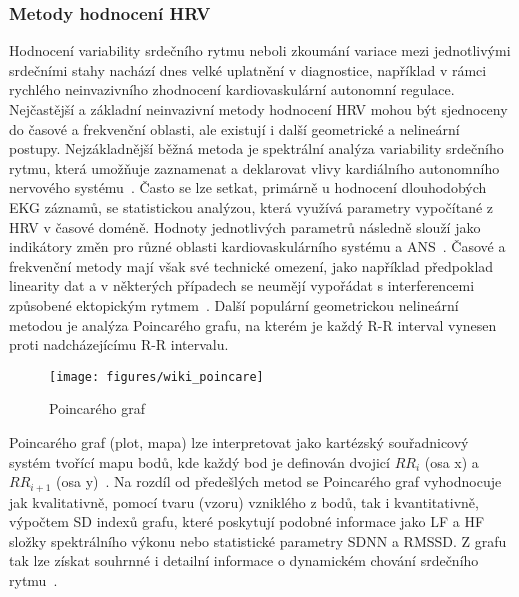 \subsubsection{Metody hodnocení HRV}
\label{section:hrv_methods}
Hodnocení variability srdečního rytmu neboli zkoumání variace mezi jednotlivými
srdečními stahy nachází dnes velké uplatnění v diagnostice, například v rámci
rychlého neinvazivního zhodnocení kardiovaskulární autonomní regulace.
Nejčastější a základní neinvazivní metody hodnocení HRV mohou být sjednoceny do
časové a frekvenční oblasti, ale existují i další geometrické a nelineární
postupy. Nejzákladnější běžná metoda je spektrální analýza variability srdečního
rytmu, která umožňuje zaznamenat a deklarovat vlivy kardiálního autonomního
nervového systému~\cite{Pumprla2014}. Často se lze setkat, primárně u hodnocení
dlouhodobých EKG záznamů, se statistickou analýzou, která využívá parametry
vypočítané z HRV v časové doméně. Hodnoty jednotlivých parametrů následně slouží
jako indikátory změn pro různé oblasti kardiovaskulárního systému a
ANS~\cite{Malik1996}. Časové a frekvenční metody mají však své technické omezení, 
jako například předpoklad linearity dat a v některých případech se neumějí
vypořádat s interferencemi způsobené ektopickým rytmem~\cite{Hsu2012}. Další
populární geometrickou nelineární metodou je analýza Poincarého grafu, na kterém
je každý R-R interval vynesen proti nadcházejícímu R-R intervalu. 

\begin{figure}[h]
	\begin{center}
		\texttt{[image: figures/wiki\_poincare]}
		\caption{Poincarého graf~\cite{wikiPoincare}}
		\label{fig:wiki_poincare}
	\end{center}
\end{figure}

Poincarého graf (plot, mapa) lze interpretovat jako kartézský souřadnicový systém
tvořící mapu bodů, kde každý bod je definován dvojicí $RR_i$ (osa x) a
$RR_{i+1}$ (osa y)~\cite{Hsu2012,Hejjel2001}. Na rozdíl od předešlých metod se
Poincarého graf vyhodnocuje jak kvalitativně, pomocí tvaru (vzoru) vzniklého z
bodů, tak i kvantitativně, výpočtem SD indexů grafu, které poskytují podobné
informace jako LF a HF složky spektrálního výkonu nebo statistické parametry
SDNN a RMSSD. Z grafu tak lze získat souhrnné i detailní informace o dynamickém
chování srdečního rytmu~\cite{Hsu2012,Kubickova2016}. 

